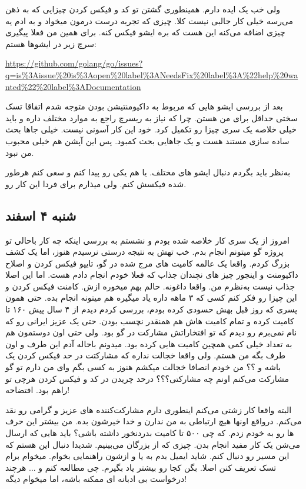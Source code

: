 ولی خب یک ایده دارم. همینطوری گشتن تو کد و فیکس کردن چیزایی که به ذهن می‌رسه خیلی کار جالبی نیست کلا. چیزی که تجربه
درست درمون میخواد و به ادم یه چیزی اضافه می‌کنه این هست که بره ایشو فیکس کنه. برای همین من فعلا پیگیری سرچ زیر در ایشوها هستم:

\url{https://github.com/golang/go/issues?q=is%3Aissue%20is%3Aopen%20label%3ANeedsFix%20label%3A%22help%20wanted%22%20label%3ADocumentation}

بعد از بررسی ایشو هایی که مربوط به داکیومنتیشن بودن متوجه شدم اتفاقا تسک سختی حداقل برای من هستن. چرا که نیاز به ریسرچ
راجع به موارد مختلف داره و باید خیلی خلاصه یک سری چیزا رو تکمیل کرد. خود این کار آسونی نیست. خیلی جاها بحث ساده سازی
مستند هست و یک جاهایی بحث کمبود. پس این آپشن هم خیلی محبوب من نبود.

به‌نظر باید بگردم دنبال ایشو های مختلف. یا هم یکی رو پیدا کنم و سعی کنم هرطور شده فیکسش کنم. ولی میذارم برای فردا این کار رو.

\subsection{شنبه ۴ اسفند}
امروز از یک سری کار خلاصه شده بودم و نشستم به بررسی اینکه چه کار باحالی تو پروژه گو میتونم انجام بدم.
خب تهش به نتیجه درستی نرسیدم هنوز، اما یک کشف بزرگ کردم. واقعا یک عالمه کامیت های مرج شده در گو، تایپو فیکس کردن و
اصلاح داکیومنت و اینجور چیز های نچندان جذاب که فعلا خودم انجام دادم هست. اما این اصلا جذاب نیست به‌نظرم من. واقعا داغونه.
حالم بهم میخوره ازش. کامنت فیکس کردن و این چیزا رو فکر کنم کسی که ۳ ماهه داره یاد میگیره هم میتونه انجام بده.
حتی همون پسری که روز قبل بهش حسودی کرده بودم، بررسی کردم دیدم از ۴ سال پیش ۱۶۰ تا کامیت کرده و تمام کامیت هاش هم همنقدر
نچسب بودن. حتی یک عزیز ایرانی رو که نام نمی‌برم رو دیدم که تو افتخاراتش مشارکت در گو بود. ولی حتی اون دوستمون هم به تعداد خیلی کمی
همچین کامیت هایی کرده بود. میدونم باحاله آدم این طرف و اون طرف بگه من  هستم. ولی واقعا خجالت نداره که مشارکتت
در حد فیکس کردن یک  باشه و  ؟؟ من خودم انصافا خجالت میکشم هنوز به کسی بگم وای من
دارم تو گو مشارکت می‌کنم اونم چه مشارکتی؟؟؟ درحد چریدن در کد و فیکس کردن هرچی تو راهم بود. افتضاحه!

البته واقعا کار زشتی می‌کنم اینطوری دارم مشارکت‌کننده های عزیز و گرامی رو نقد می‌کنم. درواقع اونها هیچ ارتباطی به من ندارن و خدا خیرشون بده.
من بیشتر این حرف ها رو به خودم زدم. که چی ۵۰۰ تا کامیت بدردنخور داشته باشی؟ باید \cl هایی که ارسال می‌شن یک کار مفید انجام بدن.
چیزی که از بزرگان می‌بینیم. شدیدا دنبال این هستم که این مسیر رو دنبال کنم. شاید ایمیل بدم به  یا 
و ازشون راهنمایی بخوام. میخوام برام تسک تعریف کنن اصلا. بگن کجا رو بیشتر یاد بگیرم. چی مطالعه کنم و ... هرچند درخواست بی ادبانه ای
ممکنه باشه، اما میخوام دیگه!

